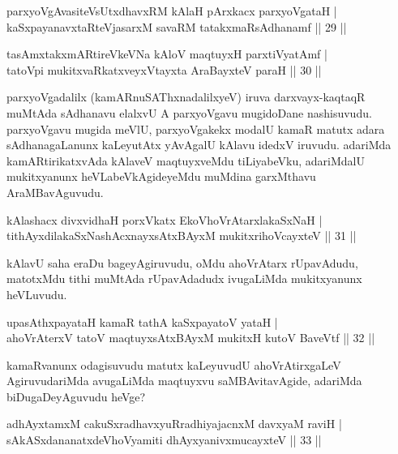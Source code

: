 \begin{shl}
parxyoVgAvasiteVsUtxdhavxRM kAlaH pArxkacx parxyoVgataH |\\
kaSxpayanavxtaRteV\s jasarxM savaRM tatakxmaRsAdhanamf \hfill || 29 || 
\end{shl}

\begin{shl}
tasAmxtakxmARtireVkeVNa kAloV maqtuyxH parxtiVyatAmf |\\
tatoV\s pi mukitxvaRkatxveyxVtayxta AraBayxteV paraH \hfill || 30 ||
\end{shl}

\begin{artha}
parxyoVgadalilx (kamARnuSAThxnadalilxyeV) iruva darxvayx-kaqtaqR muMtAda sAdhanavu elalxvU A parxyoVgavu mugidoDane nashisuvudu. parxyoVgavu mugida meVlU, parxyoVgakekx modalU kamaR matutx adara sAdhanagaLanunx kaLeyutAtx yAvAgalU kAlavu idedxV iruvudu. adariMda kamARtirikatxvAda kAlaveV maqtuyxveMdu tiLiyabeVku, adariMdalU mukitxyanunx heVLabeVkAgideyeMdu muMdina garxMthavu AraMBavAguvudu.
\end{artha}

\begin{shl}
kAlashacx divxvidhaH porxVkatx EkoV\s hoVrAtarxlakaSxNaH |\\
tithAyxdilakaSxNashAcxnayxsAtxBAyxM mukitxrihoVcayxteV \hfill || 31 ||
\end{shl}

\begin{artha}
kAlavU saha eraDu bageyAgiruvudu, oMdu ahoVrAtarx rUpavAdudu, matotxMdu tithi muMtAda rUpavAdadudx ivugaLiMda mukitxyanunx heVLuvudu.
\end{artha}


\begin{shl}
upasAthxpayataH kamaR tathA kaSxpayatoV yataH |\\
ahoVrAterxV tatoV maqtuyxsAtxBAyxM mukitxH kutoV BaveVtf \hfill || 32 ||
\end{shl}

\begin{artha}
kamaRvanunx odagisuvudu matutx kaLeyuvudU ahoVrAtirxgaLeV AgiruvudariMda avugaLiMda maqtuyxvu saMBAvitavAgide, adariMda biDugaDeyAguvudu heVge?
\end{artha}


\begin{shl}
adhAyxtamxM cakuSxradhavxyuRradhiyajacnxM davxyaM raviH |\\
sAkASxdananatxdeVhoV\s yamiti dhAyxyanivxmucayxteV \hfill || 33 ||
\end{shl}

